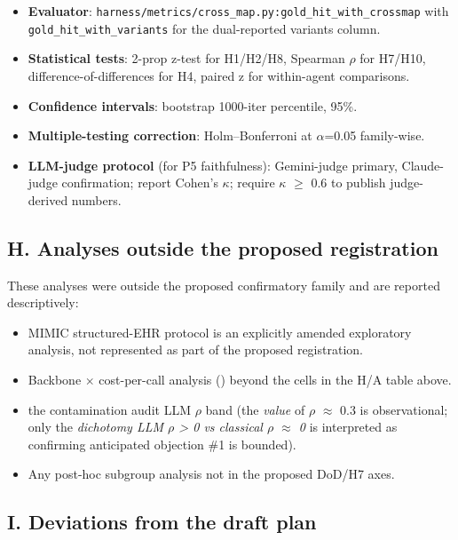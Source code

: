 \begin{itemize}
\tightlist
\item
  \textbf{Evaluator}: \texttt{harness/metrics/cross\_map.py:gold\_hit\_with\_crossmap}
  with \texttt{gold\_hit\_with\_variants} for the dual-reported variants column.
\item
  \textbf{Statistical tests}: 2-prop z-test for H1/H2/H8, Spearman \ensuremath{\rho} for
  H7/H10, difference-of-differences for H4, paired z for within-agent
  comparisons.
\item
  \textbf{Confidence intervals}: bootstrap 1000-iter percentile, 95\%.
\item
  \textbf{Multiple-testing correction}: Holm--Bonferroni at \ensuremath{\alpha}=0.05 family-wise.
\item
  \textbf{LLM-judge protocol} (for P5 faithfulness): Gemini-judge primary,
  Claude-judge confirmation; report Cohen's \ensuremath{\kappa}; require \ensuremath{\kappa} \ensuremath{\geq} 0.6 to
  publish judge-derived numbers.
\end{itemize}

\subsection{H. Analyses outside the proposed registration}\label{h.-analyses-outside-the-proposed-registration}

These analyses were outside the proposed confirmatory family and are reported
descriptively:

\begin{itemize}
\tightlist
\item
  MIMIC structured-EHR protocol is an explicitly amended exploratory analysis,
  not represented as part of the proposed registration.
\item
  Backbone \ensuremath{\times} cost-per-call analysis () beyond the cells in the H/A
  table above.
\item
  the contamination audit LLM \ensuremath{\rho} band (the \emph{value} of \ensuremath{\rho} \ensuremath{\approx} 0.3 is observational; only the
  \emph{dichotomy LLM \ensuremath{\rho} \textgreater{} 0 vs classical \ensuremath{\rho} \ensuremath{\approx} 0} is interpreted as confirming
  anticipated objection \#1 is bounded).
\item
  Any post-hoc subgroup analysis not in the proposed DoD/H7 axes.
\end{itemize}

\subsection{I. Deviations from the draft plan}\label{i.-deviations-from-the-draft-plan}

